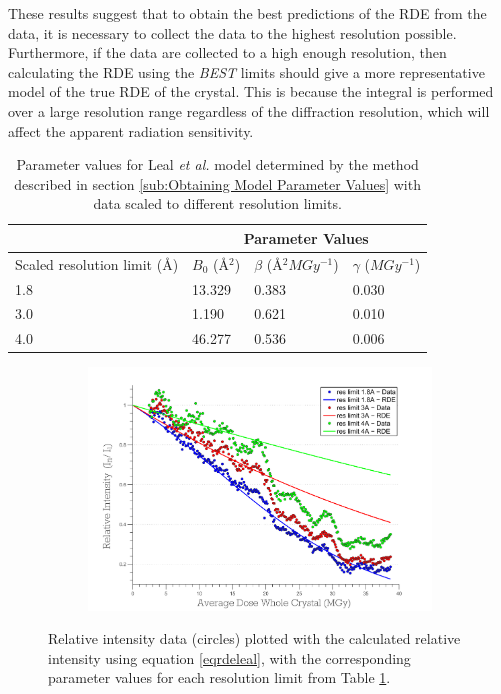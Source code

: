 These results suggest that to obtain the best predictions of the RDE from the data, it is necessary to collect the data to the highest resolution possible.
Furthermore, if the data are collected to a high enough resolution, then calculating the RDE using the \textit{BEST} limits should give a more representative model of the true RDE of the crystal.
This is because the integral is performed over a large resolution range regardless of the diffraction resolution, which will affect the apparent radiation sensitivity.

\begin{table}[ht!]
\small
\captionsetup{justification=centering}
	\caption{Parameter values for Leal \emph{et al.} model determined by the method described in section \ref{sub:Obtaining Model Parameter Values} with data scaled to different resolution limits.}
	\centering
	\begin{tabular}{p{4cm} p{2.4cm} p{2.4cm} p{2cm}}
	\cline{2-4}
		& \multicolumn{3}{c}{Parameter Values} \\
		\hline
		Scaled resolution limit (\AA)			&$B_0$ (\AA$^2$)	  &$\beta$ (\AA$^2MGy^{-1}$) 	 	&$\gamma$ ($MGy^{-1}$)		\\
		\hline
		1.8     													&13.329	    &0.383 			&0.030			\\
		3.0     													&1.190		&0.621  		&0.010			\\
		4.0     													&46.277		&0.536  		&0.006			\\
		\hline
	\end{tabular}
	\label{tab:RDE params3}
\end{table}
\begin{figure}
	\centering
	\begin{subfigure}[b]{1\textwidth}
        \centering
        \includegraphics[width=\textwidth]{figures/dwd/rescmpplot1.pdf}
        \caption{}
        \label{fig:Resolution comparison plot - scaled to diff res}
    \end{subfigure}
	\caption{Relative intensity data (circles) plotted with the calculated relative intensity using equation \ref{eqrdeleal}, with the corresponding parameter values for each resolution limit from Table \ref{tab:RDE params3}.}
	\label{figres}
\end{figure}
